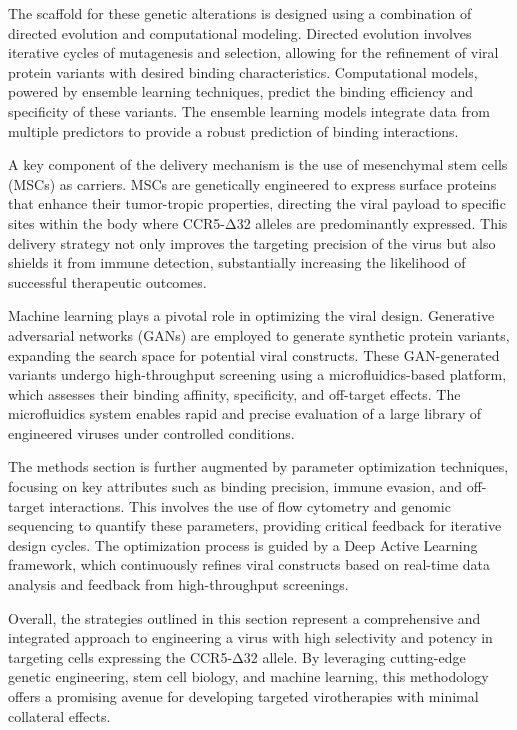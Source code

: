\documentclass{article}
\begin{document}
The scaffold for these genetic alterations is designed using a combination of directed evolution and computational modeling. Directed evolution involves iterative cycles of mutagenesis and selection, allowing for the refinement of viral protein variants with desired binding characteristics. Computational models, powered by ensemble learning techniques, predict the binding efficiency and specificity of these variants. The ensemble learning models integrate data from multiple predictors to provide a robust prediction of binding interactions.

A key component of the delivery mechanism is the use of mesenchymal stem cells (MSCs) as carriers. MSCs are genetically engineered to express surface proteins that enhance their tumor-tropic properties, directing the viral payload to specific sites within the body where CCR5-Δ32 alleles are predominantly expressed. This delivery strategy not only improves the targeting precision of the virus but also shields it from immune detection, substantially increasing the likelihood of successful therapeutic outcomes.

Machine learning plays a pivotal role in optimizing the viral design. Generative adversarial networks (GANs) are employed to generate synthetic protein variants, expanding the search space for potential viral constructs. These GAN-generated variants undergo high-throughput screening using a microfluidics-based platform, which assesses their binding affinity, specificity, and off-target effects. The microfluidics system enables rapid and precise evaluation of a large library of engineered viruses under controlled conditions.

The methods section is further augmented by parameter optimization techniques, focusing on key attributes such as binding precision, immune evasion, and off-target interactions. This involves the use of flow cytometry and genomic sequencing to quantify these parameters, providing critical feedback for iterative design cycles. The optimization process is guided by a Deep Active Learning framework, which continuously refines viral constructs based on real-time data analysis and feedback from high-throughput screenings.

Overall, the strategies outlined in this section represent a comprehensive and integrated approach to engineering a virus with high selectivity and potency in targeting cells expressing the CCR5-Δ32 allele. By leveraging cutting-edge genetic engineering, stem cell biology, and machine learning, this methodology offers a promising avenue for developing targeted virotherapies with minimal collateral effects.
\end{document}
